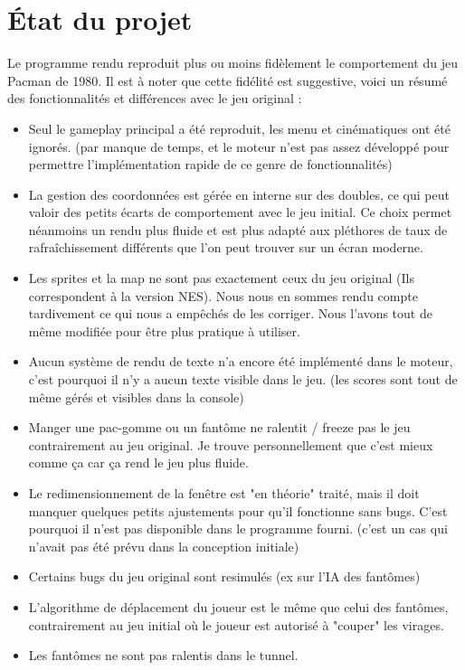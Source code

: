 \documentclass [twoside,a4paper,11pt,french] {report}
\begin{document}
\chapter{État du projet}
    Le programme rendu reproduit plus ou moins fidèlement le comportement du jeu Pacman de 1980.
    Il est à noter que cette fidélité est suggestive, voici un résumé des fonctionnalités et
    différences avec le jeu original :
    \begin{itemize}
        \item Seul le gameplay principal a été reproduit, les menu et cinématiques ont été ignorés. 
        (par manque de temps, et le moteur n'est pas assez développé pour permettre l'implémentation
        rapide de ce genre de fonctionnalités)
        \item La gestion des coordonnées est gérée en interne sur des doubles, ce qui peut valoir des petits 
        écarts de comportement avec le jeu initial. Ce choix permet néanmoins un rendu plus fluide et est plus
        adapté aux pléthores de taux de rafraîchissement différents que l'on peut trouver sur un écran moderne.
        \item Les sprites et la map ne sont pas exactement ceux du jeu original (Ils correspondent à la version NES).
        Nous nous en sommes rendu compte tardivement ce qui nous a empêchés de les corriger. 
        Nous l'avons tout de même modifiée pour être plus pratique à utiliser.
        \item Aucun système de rendu de texte n'a encore été implémenté dans le moteur, c'est pourquoi il n'y a aucun
        texte visible dans le jeu. (les scores sont tout de même gérés et visibles dans la console)
        \item Manger une pac-gomme ou un fantôme ne ralentit / freeze pas le jeu contrairement au jeu original.
        Je trouve personnellement que c'est mieux comme ça car ça rend le jeu plus fluide.
        \item Le redimensionnement de la fenêtre est "en théorie" traité, mais il doit manquer quelques petits
        ajustements pour qu'il fonctionne sans bugs. C'est pourquoi il n'est pas disponible dans le programme fourni.
        (c'est un cas qui n'avait pas été prévu dans la conception initiale)
        \item Certains bugs du jeu original sont resimulés (ex sur l'IA des fantômes)
        \item L'algorithme de déplacement du joueur est le même que celui des fantômes, contrairement au jeu initial
        où le joueur est autorisé à "couper" les virages.
        \item Les fantômes ne sont pas ralentis dans le tunnel.
    \end{itemize}
\end{document}
